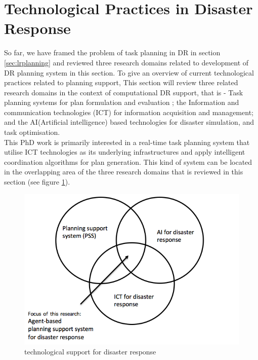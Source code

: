 \section{Technological Practices in Disaster Response} \label{sec:LRApplicationAreas}
So far, we have framed the problem of task planning in DR in section \ref{sec:lrplanning} and reviewed three research domains related to development of DR planning system in this section. To give an overview of current technological practices related to planning support, This section will review three related research domains in the context of computational DR support, that is - Task planning systems for plan formulation and evaluation ; the Information and communication technologies (ICT) for information acquisition and management; and the AI(Artificial intelligence) based technologies for disaster simulation, and task optimisation.  \\

This PhD work is primarily interested in a real-time task planning system that utilise ICT technologies as its underlying infrastructures and apply intelligent coordination algorithms for plan generation. This kind of system can be located in the overlapping area of the three research domains that is reviewed in this section (see figure \ref{fig:SystemFraming}).\\

\begin{figure}[h]
  \centering
  \includegraphics[width=1\textwidth]{img/background/SystemFraming}
  \caption{technological support for disaster response}
  \label{fig:SystemFraming}
\end{figure} 

